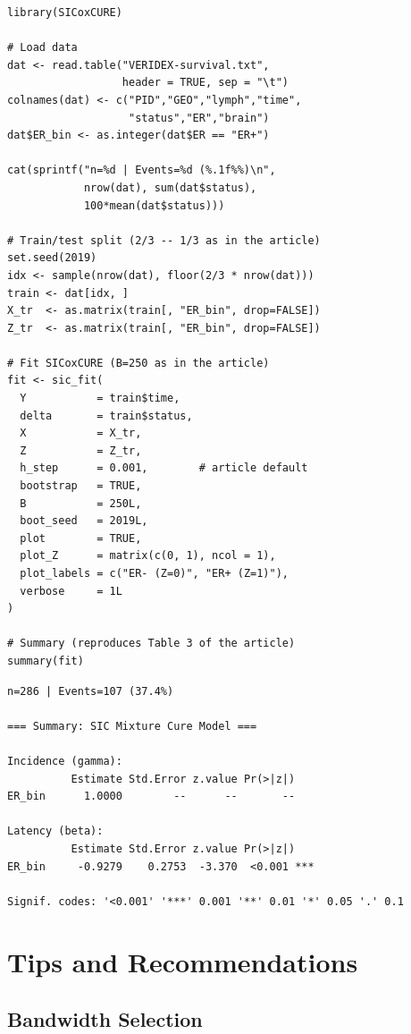 \documentclass[12pt,a4paper]{article}
\begin{document}
\begin{lstlisting}[style=Rcode,
  caption={VERIDEX application (as in the article)}]
library(SICoxCURE)

# Load data
dat <- read.table("VERIDEX-survival.txt",
                  header = TRUE, sep = "\t")
colnames(dat) <- c("PID","GEO","lymph","time",
                   "status","ER","brain")
dat$ER_bin <- as.integer(dat$ER == "ER+")

cat(sprintf("n=%d | Events=%d (%.1f%%)\n",
            nrow(dat), sum(dat$status),
            100*mean(dat$status)))

# Train/test split (2/3 -- 1/3 as in the article)
set.seed(2019)
idx <- sample(nrow(dat), floor(2/3 * nrow(dat)))
train <- dat[idx, ]
X_tr  <- as.matrix(train[, "ER_bin", drop=FALSE])
Z_tr  <- as.matrix(train[, "ER_bin", drop=FALSE])

# Fit SICoxCURE (B=250 as in the article)
fit <- sic_fit(
  Y           = train$time,
  delta       = train$status,
  X           = X_tr,
  Z           = Z_tr,
  h_step      = 0.001,        # article default
  bootstrap   = TRUE,
  B           = 250L,
  boot_seed   = 2019L,
  plot        = TRUE,
  plot_Z      = matrix(c(0, 1), ncol = 1),
  plot_labels = c("ER- (Z=0)", "ER+ (Z=1)"),
  verbose     = 1L
)

# Summary (reproduces Table 3 of the article)
summary(fit)
\end{lstlisting}

\begin{lstlisting}[style=Routput]
n=286 | Events=107 (37.4%)

=== Summary: SIC Mixture Cure Model ===

Incidence (gamma):
          Estimate Std.Error z.value Pr(>|z|)
ER_bin      1.0000        --      --       --

Latency (beta):
          Estimate Std.Error z.value Pr(>|z|)
ER_bin     -0.9279    0.2753  -3.370  <0.001 ***

Signif. codes: '<0.001' '***' 0.001 '**' 0.01 '*' 0.05 '.' 0.1
\end{lstlisting}

\section{Tips and Recommendations}

\subsection{Bandwidth Selection}
\end{document}
